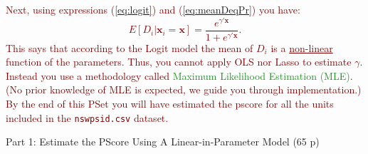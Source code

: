 \documentclass{article}
\begin{document}
\noindent \noindent \textcolor{Maroon}{Next, using expressions (\ref{eq:logit}) and (\ref{eq:meanDeqPr}) you have:
\begin{equation}\label{eq:meanLogit}
E[D_i|\mathbf{x}_i=\mathbf{x}]=\frac{e^{\gamma'\mathbf{x}}}{1 + e^{\gamma'\mathbf{x}}}.
\end{equation}
This says that according to the Logit model the mean of $D_i$ is a \underline{non-linear} function of the parameters. Thus, you cannot apply OLS nor Lasso to estimate $\gamma$. Instead you use a methodology called \textcolor{ForestGreen}{Maximum Likelihood Estimation (MLE)}. (No prior knowledge of MLE is expected, we guide you through implementation.) By the end of this PSet you will have estimated the pscore for all the units included in the \texttt{nswpsid.csv} dataset.}
\newpage


\begin{center}
{\LARGE Part 1: Estimate the PScore Using A Linear-in-Parameter Model (65 p)}
\end{center}
\end{document}
